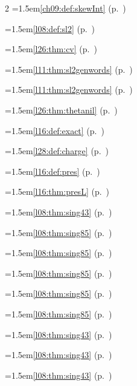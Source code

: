 \begin{multicols}{2}
\hangindent=1.5em\quad \ref{ch09:def:skewInt} (p.~\pageref{ch09:def:skewInt})\par
\hangindent=1.5em\quad \ref{l08:def:sl2} (p.~\pageref{l08:def:sl2})\par
\hangindent=1.5em\quad \ref{l26:thm:cv} (p.~\pageref{l26:thm:cv})\par
\hangindent=1.5em\quad \ref{l11:thm:sl2genwords} (p.~\pageref{l11:thm:sl2genwords})\par
\hangindent=1.5em\quad \ref{l11:thm:sl2genwords} (p.~\pageref{l11:thm:sl2genwords})\par
\hangindent=1.5em\quad \ref{l26:thm:thetanil} (p.~\pageref{l26:thm:thetanil})\par
\hangindent=1.5em\quad \ref{l16:def:exact} (p.~\pageref{l16:def:exact})\par
\hangindent=1.5em\quad \ref{l28:def:charge} (p.~\pageref{l28:def:charge})\par
\hangindent=1.5em\quad \ref{l16:def:pres} (p.~\pageref{l16:def:pres})\par
\hangindent=1.5em\quad \ref{l16:thm:presL} (p.~\pageref{l16:thm:presL})\par
\hangindent=1.5em\quad \ref{l08:thm:sing43} (p.~\pageref{l08:thm:sing43})\par
\hangindent=1.5em\quad \ref{l08:thm:sing85} (p.~\pageref{l08:thm:sing85})\par
\hangindent=1.5em\quad \ref{l08:thm:sing85} (p.~\pageref{l08:thm:sing85})\par
\hangindent=1.5em\quad \ref{l08:thm:sing85} (p.~\pageref{l08:thm:sing85})\par
\hangindent=1.5em\quad \ref{l08:thm:sing85} (p.~\pageref{l08:thm:sing85})\par
\hangindent=1.5em\quad \ref{l08:thm:sing85} (p.~\pageref{l08:thm:sing85})\par
\hangindent=1.5em\quad \ref{l08:thm:sing43} (p.~\pageref{l08:thm:sing43})\par
\hangindent=1.5em\quad \ref{l08:thm:sing43} (p.~\pageref{l08:thm:sing43})\par
\hangindent=1.5em\quad \ref{l08:thm:sing43} (p.~\pageref{l08:thm:sing43})\par

\end{multicols}
